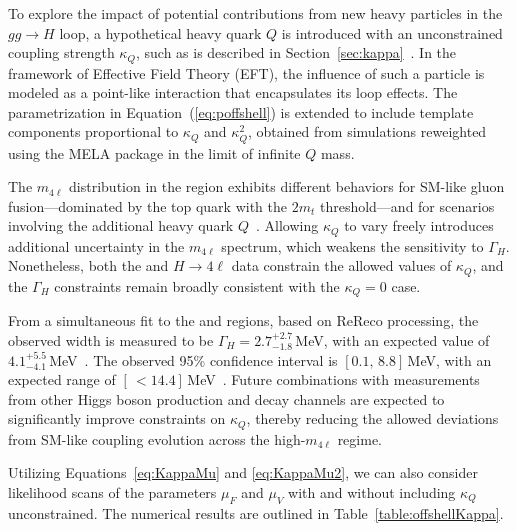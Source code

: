 To explore the impact of potential contributions from new heavy particles in the $gg \to H$ loop, a hypothetical heavy quark $Q$ is introduced with an unconstrained coupling strength $\kappa_Q$, such as is described in Section~\ref{sec:kappa}~\cite{Gritsan:2020pib,Davis:2021tiv}. In the framework of Effective Field Theory (EFT), the influence of such a particle is modeled as a point-like interaction that encapsulates its loop effects. The parametrization in Equation~(\ref{eq:poffshell}) is extended to include template components proportional to $\kappa_Q$ and $\kappa_Q^2$, obtained from simulations reweighted using the MELA package in the limit of infinite $Q$ mass. 

The $m_{4\ell}$ distribution in the \offshell region exhibits different behaviors for SM-like gluon fusion---dominated by the top quark with the $2m_t$ threshold---and for scenarios involving the additional heavy quark $Q$~\cite{Gritsan:2020pib}. Allowing $\kappa_Q$ to vary freely introduces additional uncertainty in the $m_{4\ell}$ spectrum, which weakens the sensitivity to $\Gamma_H$. Nonetheless, both the \onshell and \offshell $H \to 4\ell$ data constrain the allowed values of $\kappa_Q$, and the $\Gamma_H$ constraints remain broadly consistent with the $\kappa_Q = 0$ case.

From a simultaneous fit to the \onshell and \offshell regions, based on ReReco processing, the observed width is measured to be $\Gamma_H = 2.7^{+2.7}_{-1.8}$\,MeV, with an expected value of $4.1^{+5.5}_{-4.1}$\,MeV~\cite{PhysRevD.111.092014}. The observed 95\% confidence interval is $[0.1,\,8.8]$\,MeV, with an expected range of $[\,{<}14.4]$\,MeV~\cite{PhysRevD.111.092014}.
Future combinations with measurements from other \onshell Higgs boson production and decay channels are expected to significantly improve constraints on $\kappa_Q$, thereby reducing the allowed deviations from SM-like coupling evolution across the high-$m_{4\ell}$ regime.


Utilizing Equations~\ref{eq:KappaMu} and \ref{eq:KappaMu2}, we can also consider likelihood scans of the parameters $\mu_F$ and $\mu_V$ 
with and without including $\kappa_Q$ unconstrained. The numerical results are outlined in Table~\ref{table:offshellKappa}.

